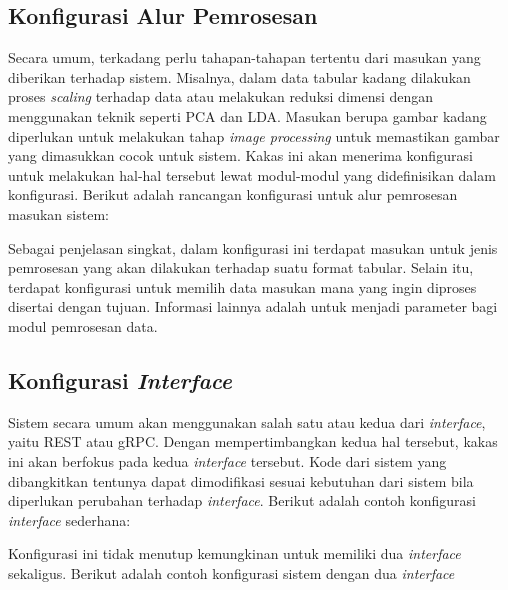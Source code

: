 
\subsection{Konfigurasi Alur Pemrosesan}
Secara umum, terkadang perlu tahapan-tahapan tertentu dari masukan yang diberikan terhadap sistem.
Misalnya, dalam data tabular kadang dilakukan proses \textit{scaling} terhadap data atau melakukan reduksi dimensi dengan menggunakan teknik seperti PCA dan LDA.
Masukan berupa gambar kadang diperlukan untuk melakukan tahap \textit{image processing} untuk memastikan gambar yang dimasukkan cocok untuk sistem.
Kakas ini akan menerima konfigurasi untuk melakukan hal-hal tersebut lewat modul-modul yang didefinisikan dalam konfigurasi.
Berikut adalah rancangan konfigurasi untuk alur pemrosesan masukan sistem:


Sebagai penjelasan singkat, dalam konfigurasi ini terdapat masukan untuk jenis pemrosesan yang akan dilakukan terhadap suatu format tabular.
Selain itu, terdapat konfigurasi untuk memilih data masukan mana yang ingin diproses disertai dengan tujuan.
Informasi lainnya adalah untuk menjadi parameter bagi modul pemrosesan data. 

\subsection{Konfigurasi \textit{Interface}}
Sistem secara umum akan menggunakan salah satu atau kedua dari \textit{interface}, yaitu REST atau gRPC.
Dengan mempertimbangkan kedua hal tersebut, kakas ini akan berfokus pada kedua \textit{interface} tersebut.
Kode dari sistem yang dibangkitkan tentunya dapat dimodifikasi sesuai kebutuhan dari sistem bila diperlukan perubahan terhadap \textit{interface}.
Berikut adalah contoh konfigurasi \textit{interface} sederhana:


Konfigurasi ini tidak menutup kemungkinan untuk memiliki dua \textit{interface} sekaligus.
Berikut adalah contoh konfigurasi sistem dengan dua \textit{interface}

